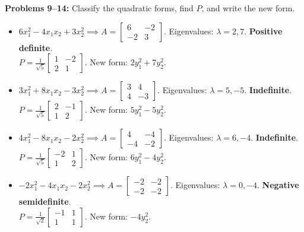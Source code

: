 \documentclass[11pt, letterpaper]{article}
\theoremstyle{definition}
\theoremstyle{remark}
\begin{document}
\textbf{Problems 9--14:} Classify the quadratic forms, find $P$, and write the new form.
\begin{itemize}
    \item[\textbf{9.}] $6x_1^2 - 4x_1 x_2 + 3x_2^2 \implies A = \begin{bmatrix} 6 & -2 \\ -2 & 3 \end{bmatrix}$. Eigenvalues: $\lambda = 2, 7$. \textbf{Positive definite}. \\
    $P = \frac{1}{\sqrt{5}} \begin{bmatrix} 1 & -2 \\ 2 & 1 \end{bmatrix}$. New form: $2y_1^2 + 7y_2^2$.
    
    \item[\textbf{10.}] $3x_1^2 + 8x_1 x_2 - 3x_2^2 \implies A = \begin{bmatrix} 3 & 4 \\ 4 & -3 \end{bmatrix}$. Eigenvalues: $\lambda = 5, -5$. \textbf{Indefinite}. \\
    $P = \frac{1}{\sqrt{5}} \begin{bmatrix} 2 & -1 \\ 1 & 2 \end{bmatrix}$. New form: $5y_1^2 - 5y_2^2$.
    
    \item[\textbf{11.}] $4x_1^2 - 8x_1 x_2 - 2x_2^2 \implies A = \begin{bmatrix} 4 & -4 \\ -4 & -2 \end{bmatrix}$. Eigenvalues: $\lambda = 6, -4$. \textbf{Indefinite}. \\
    $P = \frac{1}{\sqrt{5}} \begin{bmatrix} -2 & 1 \\ 1 & 2 \end{bmatrix}$. New form: $6y_1^2 - 4y_2^2$.
    
    \item[\textbf{12.}] $-2x_1^2 - 4x_1 x_2 - 2x_2^2 \implies A = \begin{bmatrix} -2 & -2 \\ -2 & -2 \end{bmatrix}$. Eigenvalues: $\lambda = 0, -4$. \textbf{Negative semidefinite}. \\
    $P = \frac{1}{\sqrt{2}} \begin{bmatrix} -1 & 1 \\ 1 & 1 \end{bmatrix}$. New form: $-4y_2^2$.
    

\end{itemize}
\end{document}
